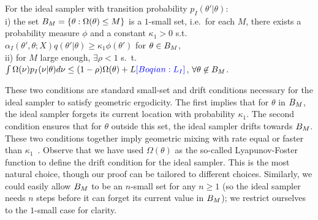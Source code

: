 \begin{assumption}
For the ideal sampler with transition probability $p_I(\theta'|\theta)$: \\
i) the set $B_M=\{\theta:\Omega(\theta)\le M \}$ is a $1$-small set,
i.e.\ for each $M$, there exists a probability measure $\phi$ and a constant
$\kappa_1 > 0$ s.t.\ %
$\alpha_I(\theta', \theta; X) q(\theta' | \theta) \ge \kappa_1 \phi(\theta')$
 for $\theta \in B_M$, \\
ii) for $M$ large enough, $\exists \rho < 1$ s.\ t.\
$\int \Omega(\nu) p_I(\nu|\theta) d\nu
\leq (1-\rho) \Omega(\theta)+L\textcolor{blue}{[Boqian: L_I]}$, $\forall \theta \not\in B_M$.
  \label{asmp:ideal_geom}
\end{assumption}
\noindent %
These two conditions are standard
small-set and drift conditions necessary for the ideal sampler to satisfy
geometric ergodicity. The first implies that for $\theta$ in
$B_M$, the ideal sampler forgets its current
location with probability $\kappa_1$. The second condition ensures that
for $\theta$ outside this set, the ideal sampler drifts towards
$B_M$. These two conditions together imply geometric
mixing with rate equal or faster than $\kappa_1$~\cite{meyn2009}.
Observe that we have used $\Omega(\theta)$ as the so-called 
Lyapunov-Foster function to define the drift condition for the ideal 
sampler. %
This is the most natural choice,
though our proof can be tailored to different choices. Similarly, we
could easily allow $B_M$ to be an $n$-small set for any $n\ge 1$ (so
the ideal sampler needs $n$ steps before it can forget its current
value in $B_M$); we restrict ourselves to the $1$-small case for
clarity.




